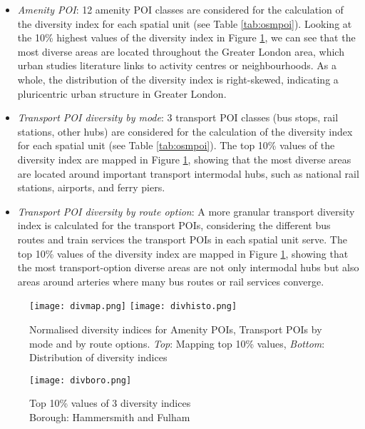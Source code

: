 \begin{itemize}
    \setlength\itemsep{0em}
    \item \textit{Amenity POI}: 12 amenity POI classes are considered for the calculation of the diversity index for each spatial unit (see Table \ref{tab:osmpoi}). Looking at the 10\% highest values of the diversity index in Figure \ref{fig:diversity}, we can see that the most diverse areas are located throughout the Greater London area, which urban studies literature links to activity centres or neighbourhoods. As a whole, the distribution of the diversity index is right-skewed, indicating a pluricentric urban structure in Greater London.
    \item \textit{Transport POI diversity by mode}: 3 transport POI classes (bus stops, rail stations, other hubs) are considered for the calculation of the diversity index for each spatial unit (see Table \ref{tab:osmpoi}). The top 10\% values of the diversity index are mapped in Figure \ref{fig:diversity}, showing that the most diverse areas are located around important transport intermodal hubs, such as national rail stations, airports, and ferry piers.
    \item \textit{Transport POI diversity by route option}: A more granular transport diversity index is calculated for the transport POIs, considering the different bus routes and train services the transport POIs in each spatial unit serve. The top 10\% values of the diversity index are mapped in Figure \ref{fig:diversity}, showing that the most transport-option diverse areas are not only intermodal hubs but also areas around arteries where many bus routes or rail services converge.
\end{itemize}

\begin{figure}[ht]
    \centering
    \texttt{[image: divmap.png]}
    \centering
    \texttt{[image: divhisto.png]}
    \captionsetup{justification=centering}
    \caption{Normalised diversity indices for Amenity POIs, Transport POIs by mode and by route options. \textit{Top}: Mapping top 10\% values, \textit{Bottom}: Distribution of diversity indices}
    \label{fig:diversity}
\end{figure}

\begin{figure}[!hbt]
    \centering
    \texttt{[image: divboro.png]}
    \captionsetup{justification=centering}
    \caption{Top 10\% values of 3 diversity indices\\Borough: Hammersmith and Fulham}
    \label{fig:diversityboro}
\end{figure}

